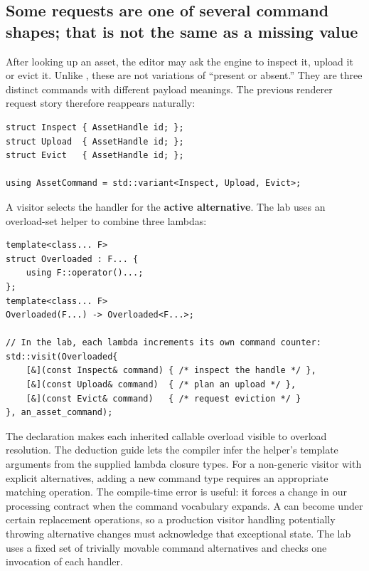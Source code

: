 \subsection{Some requests are one of several command shapes; that is not the same as a missing value}\label{05-engine-i-ch006-some-requests-are-one-of-several-command-shapes-that-is-not-the-same-as-a-missing-value}

\hypertarget{05-engine-i-ch006-some-requests-are-one-of-several-command-shapes-that-is-not-the-same-as-a-missing-value}{}

After looking up an asset, the editor may ask the engine to inspect it, upload it or evict it. Unlike , these are not variations of ``present or absent.'' They are three distinct commands with different payload meanings. The previous renderer request story therefore reappears naturally:

\begin{verbatim}
struct Inspect { AssetHandle id; };
struct Upload  { AssetHandle id; };
struct Evict   { AssetHandle id; };

using AssetCommand = std::variant<Inspect, Upload, Evict>;
\end{verbatim}

A visitor selects the handler for the \textbf{active alternative}. The lab uses an overload-set helper to combine three lambdas:

\begin{verbatim}
template<class... F>
struct Overloaded : F... {
    using F::operator()...;
};
template<class... F>
Overloaded(F...) -> Overloaded<F...>;

// In the lab, each lambda increments its own command counter:
std::visit(Overloaded{
    [&](const Inspect& command) { /* inspect the handle */ },
    [&](const Upload& command)  { /* plan an upload */ },
    [&](const Evict& command)   { /* request eviction */ }
}, an_asset_command);
\end{verbatim}

The  declaration makes each inherited callable overload visible to overload resolution. The deduction guide lets the compiler infer the helper's template arguments from the supplied lambda closure types. For a non-generic visitor with explicit alternatives, adding a new command type requires an appropriate matching operation. The compile-time error is useful: it forces a change in our processing contract when the command vocabulary expands. A  can become  under certain replacement operations, so a production visitor handling potentially throwing alternative changes must acknowledge that exceptional state. The lab uses a fixed set of trivially movable command alternatives and checks one invocation of each handler.

